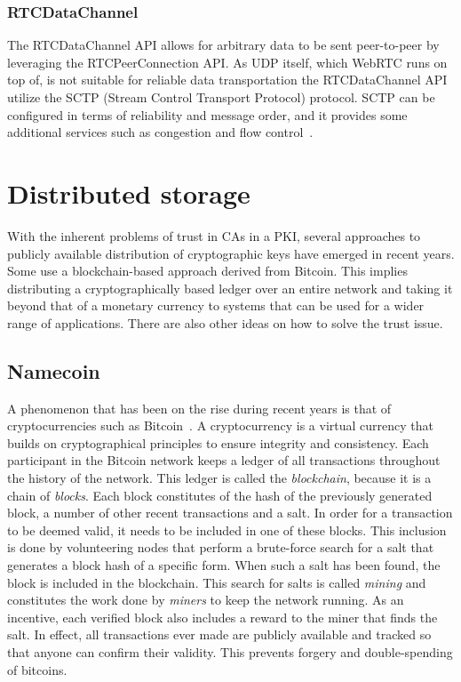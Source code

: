 \subsubsection{RTCDataChannel}
The RTCDataChannel API allows for arbitrary data to be sent peer-to-peer by leveraging the RTCPeerConnection API. As UDP itself, which WebRTC runs on top of, is not suitable for reliable data transportation the RTCDataChannel API utilize the SCTP (Stream Control Transport Protocol) protocol. SCTP can be configured in terms of reliability and message order, and it provides some additional services such as congestion and flow control~\cite{HighPerfBrowserNetworking:Online}.

\section{Distributed storage}
\label{sec:distributedstorage}
With the inherent problems of trust in CAs in a PKI, several approaches to publicly available distribution of cryptographic keys have emerged in recent years. Some use a blockchain-based approach derived from Bitcoin. This implies distributing a cryptographically based ledger over an entire network and taking it beyond that of a monetary currency to systems that can be used for a wider range of applications. There are also other ideas on how to solve the trust issue.

\subsection{Namecoin}
A phenomenon that has been on the rise during recent years is that of cryptocurrencies such as Bitcoin~\cite{nakamoto:2009}. A cryptocurrency is a virtual currency that builds on cryptographical principles to ensure integrity and consistency. Each participant in the Bitcoin network keeps a ledger of all transactions throughout the history of the network. This ledger is called the \emph{blockchain}, because it is a chain of \emph{blocks}. Each block constitutes of the hash of the previously generated block, a number of other recent transactions and a salt. In order for a transaction to be deemed valid, it needs to be included in one of these blocks. This inclusion is done by volunteering nodes that perform a brute-force search for a salt that generates a block hash of a specific form. When such a salt has been found, the block is included in the blockchain. This search for salts is called \emph{mining} and constitutes the work done by \emph{miners} to keep the network running. As an incentive, each verified block also includes a reward to the miner that finds the salt. In effect, all transactions ever made are publicly available and tracked so that anyone can confirm their validity. This prevents forgery and double-spending of bitcoins.

